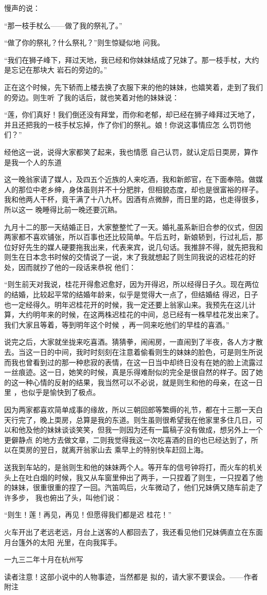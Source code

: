 \documentclass{article}
\begin{document}
慢声的说： 


“那一枝手杖么——做了我的祭礼了。” 

“做了你的祭礼？什么祭礼？”则生惊疑似地
问我。 

“我们在狮子峰下，拜过天地，我已经和你妹妹结成了兄妹了。那一枝手杖，大约是忘记在那块大
岩石的旁边的。” 

正在这个时候，先下轿而上楼去换了衣服下来的他的妹妹，也嬉笑着，走到了我们的旁边。则生听
了我的话后，就也笑着对他的妹妹说： 

“莲，你们真好！我们倒还没有拜堂，而你和老郁，却已经在狮子峰拜过天地了，并且还把我的一枝手杖忘掉，作了你们的祭礼。娘！你说这事情应怎
么罚罚他们？” 

经他这一说，说得大家都笑了起来，我也情愿
\newpage
自己认罚，就认定后日耎房，算作是我一个人的东道

这一晚翁家请了媒人，及四五个近族的人来吃酒，我和新郎官，在下面奉陪。做媒人的那位中老乡绅，身体虽则并不十分肥胖，但相貌态度，却也是很富裕的样子。我和他两人干杯，竟干满了十八九杯。因酒有点微醉，而日里的路，也走得很多，所以这一
晚睡得比前一晚还要沉熟。 

九月十二的那一天结婚正日，大家整整忙了一天。婚礼虽系新旧合参的仪式，但因两家都不喜欢铺张，所以百事也还比较简单。午后五时，新娘轿到，行过礼后，那位好好先生的媒人硬要拖我出来，代表来宾，说几句话。我推辞不得，就先把我和则生在日本念书时候的交情说了一说，末了我就想起了则生同我说的迟桂花的好处，因而就抄了他的一段话来恭祝
他们： 

“则生前天对我说，桂花开得愈迟愈好，因为开得迟，所以经得日子久。现在两位的结婚，比较起平常的结婚年龄来，似乎是觉得大一点了，但结婚结
\newpage
得迟，日子也一定经得久。明年迟桂花开的时候，我一定还要上翁家山来。我预先在这儿计算，大约明年来的时候，在这两株迟桂花的中间，总已经有一株早桂花发出来了。我们大家且等着，等到明年这个时候
，再一同来吃他们的早桂的喜酒。” 

说完之后，大家就坐拢来吃喜酒。猜猜拳，闹闹房，一直闹到了半夜，各人方才散去。当这一日的中间，我时时刻刻在注意着偷看则生的妹妹的脸色，可是则生所说而我也曾看到过的那一种悲寂的表情，在这一日当中却终日没有在她的脸上流露过一丝痕迹。这一日，她笑的时候，真是乐得难耐似的完全是很自然的样子。因了她的这一种心情的反射的结果，我当然可以不必说，就是则生和他的母亲，在这一日里
，也似乎是愉快到了极点。 

因为两家都喜欢简单成事的缘故，所以三朝回郎等繁缛的礼节，都在十三那一天白天行完了，晚上耎房，总算是我的东道。则生虽则很希望我在他家里多住几日，可以和他及他的妹妹谈谈笑笑，但我一则因为还有一篇稿子没有做成，想另外上一个更僻静点
\newpage
的地方去做文章，二则我觉得我这一次吃喜酒的目的也已经达到了，所以在耎房的翌日，就离开翁家山去
乘早上的特别快车赶回上海。 

送我到车站的，是翁则生和他的妹妹两个人。等开车的信号钟将打，而火车的机关头上在吐白烟的时候，我又从车窗里伸出了两手，一只捏着了则生，一只捏着了他的妹妹，很重很重的捏了一回。汽笛鸣后，火车微动了，他们兄妹俩又随车前走了许多步，
我也俯出了头，叫他们说： 

“则生！莲！再见，再见！但愿得我们都是迟
桂花！” 

火车开出了老远老远，月台上送客的人都回去了，我还看见他们兄妹俩直立在东面月台篷外的太阳
光里，在向我挥手。 


一九三二年十月在杭州写 

读者注意！这部小说中的人物事迹，当然都是
\newpage
拟的，请大家不要误会。——作者附注
\end{document}
